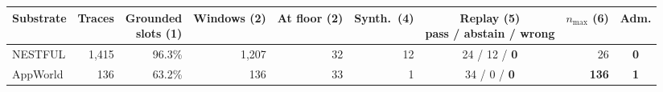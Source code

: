 \begin{tabular}{@{}lrrrrrcrc@{}}
\toprule
Substrate & Traces & \shortstack{Grounded\\slots (1)} & Windows (2) & At floor (2) & Synth.\ (4) & \shortstack{Replay (5)\\pass / abstain / \textbf{wrong}} & $n_{\max}$ (6) & Adm. \\
\midrule
NESTFUL   & 1{,}415 & 96.3\% & 1{,}207 & 32 & 12 & 24 / 12 / \textbf{0} & 26 & \textbf{0} \\
AppWorld  &     136 & 63.2\% &     136 & 33 &  1 & 34 /  0 / \textbf{0} & \textbf{136} & \textbf{1} \\
\bottomrule
\end{tabular}
